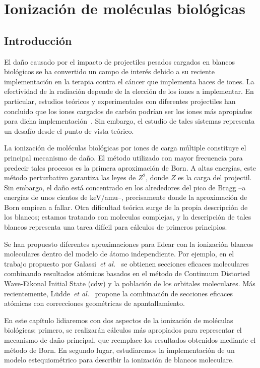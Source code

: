 \chapter{Ionización de moléculas biológicas}

\section{Introducción}

El daño causado por el impacto de projectiles pesados cargados en blancos
biológicos se ha convertido un campo de interés debido a su reciente
implementación en la terapia contra el cáncer que implementa haces de 
iones. La efectividad de la radiación depende de la elección de los iones
a implementar. En particular, estudios teóricos y experimentales con
diferentes projectiles han concluido que los iones cargados de carbón 
podrían ser los iones más apropiados para dicha 
implementación~\cite{Mohamad2017}. Sin embargo, el estudio de tales 
sistemas representa un desafío desde el punto de vista teórico.

La ionización de moléculas biológicas por iones de carga múltiple 
constituye el principal mecanismo de daño. El método utilizado con mayor
frecuencia para predecir tales procesos es la primera aproximación de 
Born. A altas energías, este método perturbativo garantiza las leyes de
$Z^2$, donde $Z$ es la carga del projectil. Sin embargo, el daño está 
concentrado en los alrededores del pico de Bragg --a energías de unos 
cientos de keV/amu--, precisamente donde la aproximación de Born empieza
a fallar. Otra dificultad teórica surge de la propia descripción de 
los blancos; estamos tratando con moleculas complejas, y la descripción
de tales blancos representa una tarea difícil para cálculos de primeros
principios.

Se han propuesto diferentes aproximaciones para lidear con la ionización
blancos moleculares dentro del modelo de átomo independiente. Por ejemplo,
en el trabajo propuesto por Galassi~\textit{et al.}~\cite{galassi2000} se
obtienen secciones eficaces moleculares combinando resultados atómicos 
basados en el método de Continuum Distorted Wave-Eikonal Initial State
(\acs{cdw}) y la población de los orbitales moleculares. Más recientemente,
L\"udde~\textit{et al.}~\cite{ludde2016,ludde2018} propone la combinación
de secciones eficaces atómicas con correcciones geométricas de 
apantallamiento.

En este capítulo lidiaremos con dos aspectos de la ionización de moléculas
biológicas; primero, se realizarán cálculos más apropiados para representar
el mecanismo de daño principal, que reemplace los resultados obtenidos
mediante el método de Born. En segundo lugar, estudiaremos la 
implementación de un modelo estequiométrico para describir la ionización
de blancos moleculare.
 
